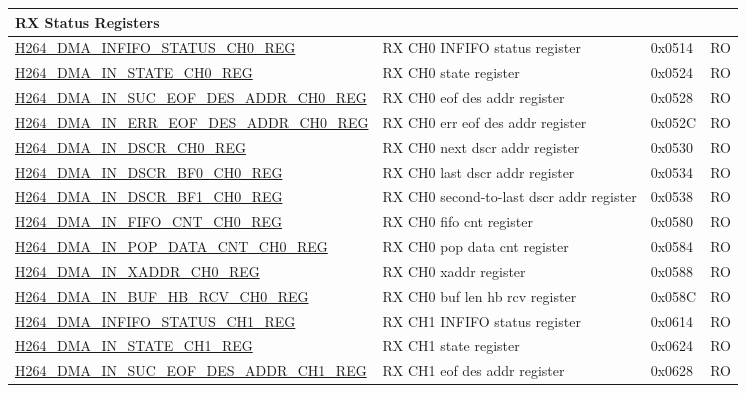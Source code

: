 \begin{longtable}{ | p{7.5cm} | p{5.7cm} | p{1.2cm} | p{1cm} | }
    \multicolumn{4}{|l|}{\textbf{RX Status Registers}} \\ \hline
    \hyperref[regdesc:H264DMAINFIFOSTATUSCH0REG]{H264\_DMA\_INFIFO\_STATUS\_CH0\_REG} & RX CH0 INFIFO status register & 0x0514 & RO \\ \hline
    \hyperref[regdesc:H264DMAINSTATECH0REG]{H264\_DMA\_IN\_STATE\_CH0\_REG} & RX CH0 state register & 0x0524 & RO \\ \hline
    \hyperref[regdesc:H264DMAINSUCEOFDESADDRCH0REG]{H264\_DMA\_IN\_SUC\_EOF\_DES\_ADDR\_CH0\_REG} & RX CH0 eof des addr register & 0x0528 & RO \\ \hline
    \hyperref[regdesc:H264DMAINERREOFDESADDRCH0REG]{H264\_DMA\_IN\_ERR\_EOF\_DES\_ADDR\_CH0\_REG} & RX CH0 err eof des addr register & 0x052C & RO \\ \hline
    \hyperref[regdesc:H264DMAINDSCRCH0REG]{H264\_DMA\_IN\_DSCR\_CH0\_REG} & RX CH0 next dscr addr register & 0x0530 & RO \\ \hline
    \hyperref[regdesc:H264DMAINDSCRBF0CH0REG]{H264\_DMA\_IN\_DSCR\_BF0\_CH0\_REG} & RX CH0 last dscr addr register & 0x0534 & RO \\ \hline
    \hyperref[regdesc:H264DMAINDSCRBF1CH0REG]{H264\_DMA\_IN\_DSCR\_BF1\_CH0\_REG} & RX CH0 second-to-last dscr addr register & 0x0538 & RO \\ \hline
    \hyperref[regdesc:H264DMAINFIFOCNTCH0REG]{H264\_DMA\_IN\_FIFO\_CNT\_CH0\_REG} & RX CH0 fifo cnt register & 0x0580 & RO \\ \hline
    \hyperref[regdesc:H264DMAINPOPDATACNTCH0REG]{H264\_DMA\_IN\_POP\_DATA\_CNT\_CH0\_REG} & RX CH0 pop data cnt register & 0x0584 & RO \\ \hline
    \hyperref[regdesc:H264DMAINXADDRCH0REG]{H264\_DMA\_IN\_XADDR\_CH0\_REG} & RX CH0 xaddr register & 0x0588 & RO \\ \hline
    \hyperref[regdesc:H264DMAINBUFHBRCVCH0REG]{H264\_DMA\_IN\_BUF\_HB\_RCV\_CH0\_REG} & RX CH0 buf len hb rcv register & 0x058C & RO \\ \hline
    \hyperref[regdesc:H264DMAINFIFOSTATUSCH1REG]{H264\_DMA\_INFIFO\_STATUS\_CH1\_REG} & RX CH1 INFIFO status register & 0x0614 & RO \\ \hline
    \hyperref[regdesc:H264DMAINSTATECH1REG]{H264\_DMA\_IN\_STATE\_CH1\_REG} & RX CH1 state register & 0x0624 & RO \\ \hline
    \hyperref[regdesc:H264DMAINSUCEOFDESADDRCH1REG]{H264\_DMA\_IN\_SUC\_EOF\_DES\_ADDR\_CH1\_REG} & RX CH1 eof des addr register & 0x0628 & RO \\ \hline

\end{longtable}
